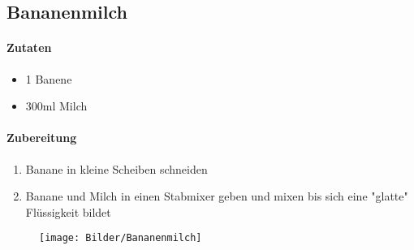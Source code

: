 \newpage
\subsection{Bananenmilch}
\paragraph{Zutaten}
\begin{itemize}[noitemsep]
	\item 1 Banene
	\item 300ml Milch
\end{itemize}
\paragraph{Zubereitung}
\begin{enumerate}[noitemsep]
	\item Banane in kleine Scheiben schneiden
	\item Banane und Milch in einen Stabmixer geben und mixen bis sich eine "glatte" Flüssigkeit bildet 
\end{enumerate}
\vspace{2.5cm}
\begin{figure}[h]
\centering
\texttt{[image: Bilder/Bananenmilch]}
\end{figure}
